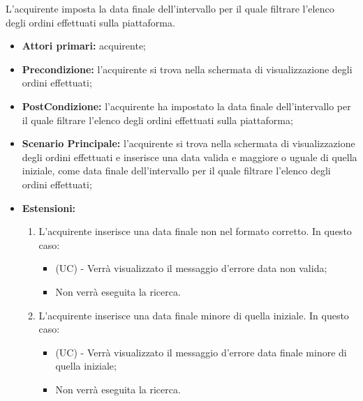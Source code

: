 L'acquirente imposta la data finale dell'intervallo per il quale filtrare l'elenco degli ordini effettuati sulla piattaforma.
\begin{itemize}
    \item \textbf{Attori primari:} acquirente;
    \item \textbf{Precondizione:} l'acquirente si trova nella schermata di visualizzazione degli ordini effettuati;
    \item \textbf{PostCondizione:} l'acquirente ha impostato la data finale dell'intervallo per il quale filtrare l'elenco degli ordini effettuati sulla piattaforma;
    \item \textbf{Scenario Principale:} l'acquirente si trova nella schermata di visualizzazione degli ordini effettuati e inserisce una data valida e maggiore o uguale di quella iniziale, come data finale dell'intervallo per il quale filtrare l'elenco degli ordini effettuati;
    \item \textbf{Estensioni:}
    \begin{enumerate}[label=\lett]
        \item L'acquirente inserisce una data finale non nel formato corretto. In questo caso:
        \begin{itemize}
            \item (UC) - Verrà visualizzato il messaggio d'errore data non valida;
            \item Non verrà eseguita la ricerca.
        \end{itemize} 
        \item L'acquirente inserisce una data finale minore di quella iniziale. In questo caso:
        \begin{itemize}
            \item (UC) - Verrà visualizzato il messaggio d'errore data finale minore di quella iniziale;
            \item Non verrà eseguita la ricerca.
        \end{itemize}
    \end{enumerate}
\end{itemize}
